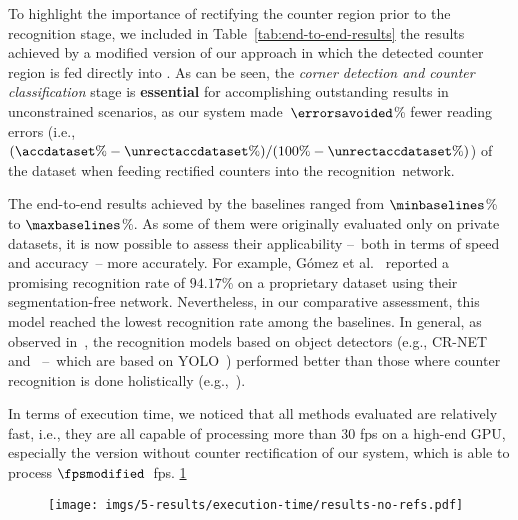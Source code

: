 To highlight the importance of rectifying the counter region prior to the recognition stage, we included in Table~\ref{tab:end-to-end-results} the results achieved by a modified version of our approach in which the detected counter region is fed directly into \ocrnet {}.
As can be seen, the \textit{corner detection and counter classification} stage is \textbf{essential} for accomplishing outstanding results in unconstrained scenarios, as our system made~$\errorsavoided$\% fewer reading errors  (i.e., $(\accdataset\%-\unrectaccdataset\%)/(100\%-\unrectaccdataset\%)$)  of the \dataset dataset when feeding rectified counters into the recognition~network.



The end-to-end results achieved by the baselines ranged from $\minbaselines$\% to $\maxbaselines$\%.
As some of them were originally evaluated only on private datasets, it is now possible to assess their applicability --~both in terms of speed and accuracy~-- more accurately.
For example, Gómez et al.~\cite{gomez2018cutting} reported a promising recognition rate of $94.17$\% on a proprietary dataset using their segmentation-free network.
Nevertheless, in our comparative assessment, this model reached the lowest recognition rate among the baselines.
In general, as observed in~\cite{laroca2019convolutional}, the recognition models  based on object detectors (e.g., CR-NET and \ocrnet~--~which are based on YOLO~\cite{redmon2016yolo}) performed better than those where counter recognition is done holistically (e.g.,~\cite{shi2017endtoend,gomez2018cutting,baek2019what,calefati2019reading}).

In terms of execution time, we noticed that all methods evaluated are relatively fast, i.e., they are all capable of processing more than $30$ \gls*{fps} on a high-end GPU, especially the version without counter rectification of our system, which is able to process $\fpsmodified$~\gls*{fps}.
\ref{fig:performance-graph}

\begin{figure}[!htb]
    \centering
    \texttt{[image: imgs/5-results/execution-time/results-no-refs.pdf]}
    
    \vspace{-3mm}
    
    \caption{\small {}}
    \label{fig:performance-graph}
\end{figure}


